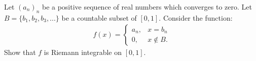 \documentclass[preview, border=10pt]{standalone}
\begin{document}
    Let $(a_n)_n$ be a positive sequence of real numbers which converges to zero. Let $B = \{b_1,b_2,b_3,...\}$ be a countable subset of $[0,1]$. Consider the function:
        \begin{equation*}
        \begin{split}
            f(x) = 
            \begin{cases}
                a_n, & x=b_n \\
                0, & x \not\in B.
            \end{cases}
        \end{split}
        \end{equation*}
    Show that $f$ is Riemann integrable on $[0,1]$.
\end{document}
